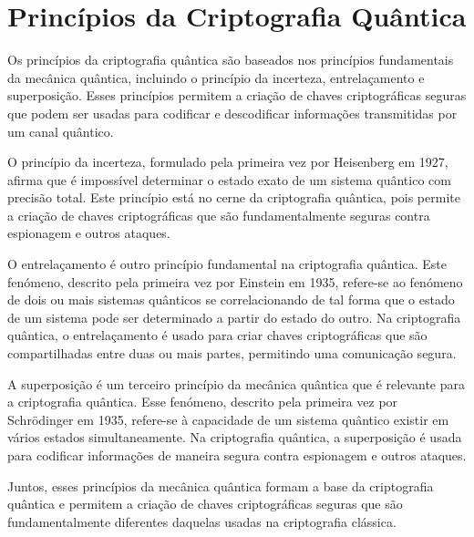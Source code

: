\chapter{Princípios da Criptografia Quântica}

Os princípios da criptografia quântica são baseados nos princípios fundamentais da mecânica quântica, incluindo o princípio da incerteza, entrelaçamento e superposição. Esses princípios permitem a criação de chaves criptográficas seguras que podem ser usadas para codificar e descodificar informações transmitidas por um canal quântico.

O princípio da incerteza, formulado pela primeira vez por Heisenberg em 1927, afirma que é impossível determinar o estado exato de um sistema quântico com precisão total. Este princípio está no cerne da criptografia quântica, pois permite a criação de chaves criptográficas que são fundamentalmente seguras contra espionagem e outros ataques.

O entrelaçamento é outro princípio fundamental na criptografia quântica. Este fenómeno, descrito pela primeira vez por Einstein em 1935, refere-se ao fenómeno de dois ou mais sistemas quânticos se correlacionando de tal forma que o estado de um sistema pode ser determinado a partir do estado do outro. Na criptografia quântica, o entrelaçamento é usado para criar chaves criptográficas que são compartilhadas entre duas ou mais partes, permitindo uma comunicação segura.

A superposição é um terceiro princípio da mecânica quântica que é relevante para a criptografia quântica. Esse fenómeno, descrito pela primeira vez por Schrödinger em 1935, refere-se à capacidade de um sistema quântico existir em vários estados simultaneamente. Na criptografia quântica, a superposição é usada para codificar informações de maneira segura contra espionagem e outros ataques.

Juntos, esses princípios da mecânica quântica formam a base da criptografia quântica e permitem a criação de chaves criptográficas seguras que são fundamentalmente diferentes daquelas usadas na criptografia clássica.

